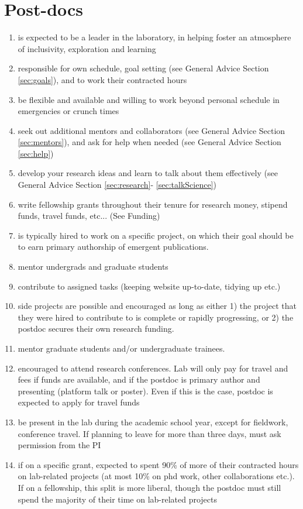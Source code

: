 \documentclass[12pt]{article}
\begin{document}
\section{Post-docs}
\begin{enumerate}
\item is expected to be a leader in the laboratory, in helping foster
  an atmosphere of inclusivity, exploration and learning
\item  responsible for own schedule, goal setting (see General
  Advice Section \ref{sec:goals}), and to work their contracted hours
\item be flexible and available and willing to work beyond personal
  schedule in emergencies or crunch times
\item seek out additional mentors and collaborators (see General
  Advice Section \ref{sec:mentors}), and ask for help when needed (see
  General Advice Section \ref{sec:help})
\item develop your research ideas and learn to talk about them
  effectively (see General Advice Section \ref{sec:research}-
  \ref{sec:talkScience})
\item  write fellowship grants throughout their tenure
  for research money, stipend funds, travel funds, etc... (See Funding)
\item is typically hired to work on a specific project, on which
  their goal should be to earn primary authorship of emergent
  publications.
\item mentor undergrads and graduate students
\item contribute to assigned tasks (keeping website up-to-date,
  tidying up etc.)
\item side projects are possible and encouraged as long as either 1)
  the project that they were hired to contribute to is complete or
  rapidly progressing, or 2) the postdoc secures their own research
  funding.
\item mentor graduate students and/or undergraduate trainees.
\item encouraged to attend research conferences. Lab will only pay
  for travel and fees if funds are available, and if the postdoc is
  primary author and presenting (platform talk or poster). Even if
  this is the case, postdoc is expected to apply for travel funds
\item be present in the lab during the academic school year, except
  for fieldwork, conference travel. If planning to leave for more than
  three days, must ask permission from the PI
\item if on a specific grant, expected to spent 90\% of more of
  their contracted hours on lab-related projects (at most 10\%
  on phd work, other collaborations etc.). If on a fellowship,
  this split is more liberal, though the postdoc must still
  spend the majority of their time on lab-related projects 
\end{enumerate}
\end{document}
